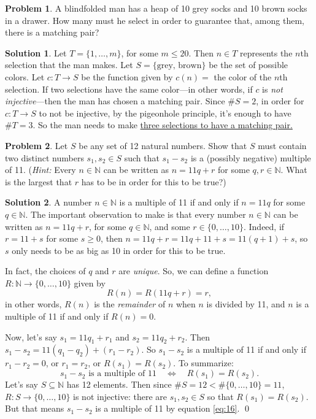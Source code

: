 \documentclass{article}
\numberwithin{equation}{section}
\theoremstyle{plain}
\theoremstyle{definition}
\newtheorem{problem}{Problem}
\newtheorem*{solution*}{Solution}
\newcommand{\N}{\mathbb N}
\begin{document}
\begin{problem}
	A blindfolded man has a heap of 10 grey socks and 10 brown socks in a drawer. How many must he select in order to guarantee that, among them, there is a matching pair?
\end{problem}

\begin{solution*}
	Let $T = \{1, \ldots, m\}$, for some $m \leq 20$. Then $n \in T$ represents the $n$th selection that the man makes. Let $S = \{\textrm{grey, brown}\}$ be the set of possible colors. Let $c : T \to S$ be the function given by $c(n) = $ the color of the $n$th selection. If two selections have the same color---in other words, if $c$ is \emph{not injective}---then the man has chosen a matching pair. Since $\#S = 2$, in order for $c : T \to S$ to not be injective, by the pigeonhole principle, it's enough to have $\#T = 3$. So the man needs to make \underline{three selections to have a matching pair.}
\end{solution*}

\begin{problem}
	Let $S$ be any set of 12 natural numbers. Show that $S$ must contain two distinct numbers $s_1, s_2 \in S$ such that $s_1 - s_2$ is a (possibly negative) multiple of 11. (\emph{Hint:} Every $n \in \N$ can be written as $n = 11q + r$ for some $q, r \in \N$. What is the largest that $r$ has to be in order for this to be true?)
\end{problem}

\begin{solution*}
	A number $n \in \N$ is a multiple of 11 if and only if $n = 11q$ for some $q \in \N$. The important observation to make is that every number $n \in \N$ can be written as $n = 11q + r$, for some $q \in \N$, and some $r \in \{0, \ldots, 10\}$. Indeed, if $r = 11+s$ for some $s \geq 0$, then $n = 11q + r = 11q + 11 + s = 11(q+1)+s$, so $s$ only needs to be as big as 10 in order for this to be true. 
	
	In fact, the choices of $q$ and $r$ are \emph{unique}. So, we can define a function $R : \N\to \{0, \ldots, 10\}$ given by 
	\[
	R(n) = R(11q + r) = r,
	\]
	in other words, $R(n)$ is the \emph{remainder} of $n$ when $n$ is divided by 11, and $n$ is a multiple of 11 if and only if $R(n) = 0$. 
	
	Now, let's say $s_1 = 11q_1 + r_1$ and $s_2 = 11q_2 + r_2$. Then $s_1 - s_2 = 11(q_1 - q_2) + (r_1 - r_2)$. So $s_1 - s_2$ is a multiple of 11 if and only if $r_1 - r_2 = 0$, or $r_1 = r_2$, or $R(s_1) = R(s_2)$. To summarize: 
	\begin{equation}\label{eq:16}
	s_1 - s_2  \textrm{ is a multiple of 11} \quad \Leftrightarrow \quad R(s_1) = R(s_2). 
	\end{equation}
	Let's say $S \subseteq \N$ has 12 elements. Then since $\#S = 12 < \#\{0, \ldots, 10\} = 11$, $R : S \to \{0, \ldots, 10\}$ is not injective: there are $s_1, s_2 \in S$ so that $R(s_1) = R(s_2)$. But that means $s_1 - s_2$ is a multiple of 11 by equation \eqref{eq:16}. \qed
\end{solution*}
\end{document}
